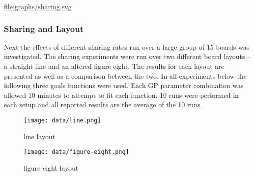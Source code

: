 \documentclass[11pt]{article}
\begin{document}
\href{file:///nfs/adaptive/eschulte/src/gp4ixm-report/graphs/sharing.svg}{file:graphs/sharing.svg}

\subsubsection*{Sharing and Layout}
\label{sec-1.5.3}

Next the effects of different sharing rates run over a large group of
15 boards was investigated.  The sharing experiments were run over two
different board layouts -- a straight line and an altered figure
eight.  The results for each layout are presented as well as a
comparison between the two.  In all experiments below the following
three goals functions were used.  Each GP parameter combination was
allowed 10 minutes to attempt to fit each function.  10 runs were
performed in each setup and all reported results are the average of
the 10 runs.

\begin{figure}[htb]
\centering
\texttt{[image: data/line.png]}
\caption{line layout}
\end{figure}

\begin{figure}[htb]
\centering
\texttt{[image: data/figure-eight.png]}
\caption{figure eight layout}
\end{figure}
\end{document}
